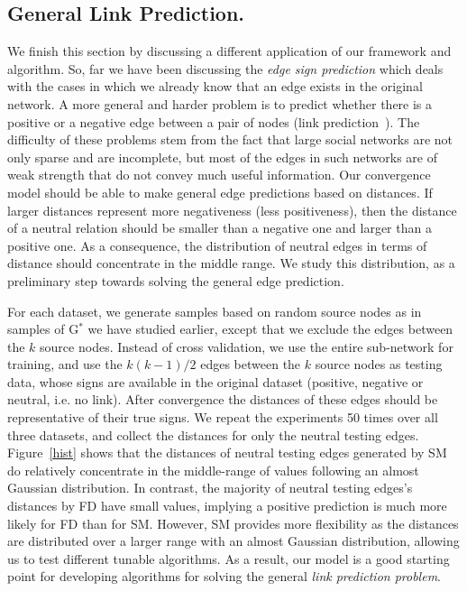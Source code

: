 \documentclass[acmtweb]{acmsmall}
\begin{document}
\subsection{General Link Prediction.} \label{sec:link-prediction}
We finish this section by discussing a different application of our
framework and algorithm. So, far we have been discussing the {\it edge
  sign prediction} which deals with the cases in which we already know
that an edge exists in the original network. A more general and harder
problem is to predict whether there is a positive or a negative edge
between a pair of nodes (link prediction~\cite{Kleinberg:03}). The
difficulty of these problems stem from the fact that large social
networks are not only sparse and are incomplete, but most of the edges
in such networks are of weak strength that do not convey much useful
information. Our convergence model should be able to make general edge
predictions based on distances. If larger distances represent more
negativeness (less positiveness), then the distance of a neutral
relation should be smaller than a negative one and larger than a
positive one. As a consequence, the distribution of neutral edges in
terms of distance should concentrate in the middle range. We study
this distribution, as a preliminary step towards solving the general
edge prediction.

For each dataset, we generate samples based on random source nodes as
in samples of G$^*$ we have studied earlier, except that we exclude
the edges between the $k$ source nodes. Instead of cross validation,
we use the entire sub-network for training, and use the $k(k-1)/2$
edges between the $k$ source nodes as testing data, whose signs are
available in the original dataset (positive, negative or neutral,
i.e. no link). 
After convergence the distances of these edges should be
representative of their true signs. We repeat the experiments 50 times
over all three datasets, and collect the distances for only the
neutral testing edges. Figure~\ref{hist} shows that the distances of
neutral testing edges generated by SM do relatively concentrate in the
middle-range of values following an almost Gaussian distribution. In
contrast, the majority of neutral testing edges's distances by FD have
small values, implying a positive prediction is much more likely for
FD than for SM.  However, SM provides more flexibility as the
distances are distributed over a larger range with an almost Gaussian
distribution, allowing us to test different tunable algorithms.
As a result, our model
is a good starting point for developing algorithms for solving the general
{\it link prediction problem}.
\end{document}
